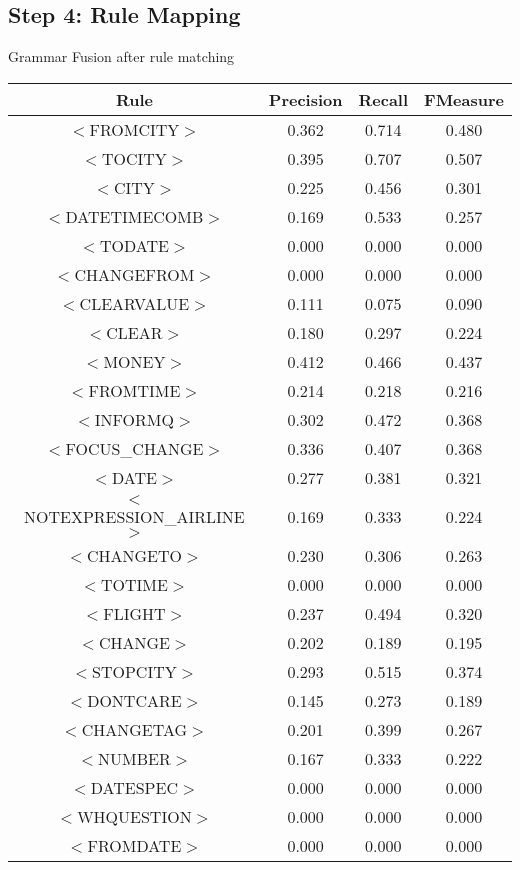 \documentclass[a4paper,10pt]{article}
\begin{document}
\subsection{Step 4: Rule Mapping}
Grammar Fusion after rule matching

 \label{tab:title} 
\begin{center}
\begin{tabular}{|c||c|c|c|}
\hline
Rule&Precision&Recall&FMeasure\\
\hline
\hline
$<$FROMCITY$>$&0.362&0.714&0.480 \\
\hline$<$TOCITY$>$&0.395&0.707&0.507 \\
\hline$<$CITY$>$&0.225&0.456&0.301 \\
\hline$<$DATETIMECOMB$>$&0.169&0.533&0.257 \\
\hline$<$TODATE$>$&0.000&0.000&0.000 \\
\hline$<$CHANGEFROM$>$&0.000&0.000&0.000 \\
\hline$<$CLEARVALUE$>$&0.111&0.075&0.090 \\
\hline$<$CLEAR$>$&0.180&0.297&0.224 \\
\hline$<$MONEY$>$&0.412&0.466&0.437 \\
\hline$<$FROMTIME$>$&0.214&0.218&0.216 \\
\hline$<$INFORMQ$>$&0.302&0.472&0.368 \\
\hline$<$FOCUS\_CHANGE$>$&0.336&0.407&0.368 \\
\hline$<$DATE$>$&0.277&0.381&0.321 \\
\hline$<$NOTEXPRESSION\_AIRLINE$>$&0.169&0.333&0.224 \\
\hline$<$CHANGETO$>$&0.230&0.306&0.263 \\
\hline$<$TOTIME$>$&0.000&0.000&0.000 \\
\hline$<$FLIGHT$>$&0.237&0.494&0.320 \\
\hline$<$CHANGE$>$&0.202&0.189&0.195 \\
\hline$<$STOPCITY$>$&0.293&0.515&0.374 \\
\hline$<$DONTCARE$>$&0.145&0.273&0.189 \\
\hline$<$CHANGETAG$>$&0.201&0.399&0.267 \\
\hline$<$NUMBER$>$&0.167&0.333&0.222 \\
\hline$<$DATESPEC$>$&0.000&0.000&0.000 \\
\hline$<$WHQUESTION$>$&0.000&0.000&0.000 \\
\hline$<$FROMDATE$>$&0.000&0.000&0.000 \\

\end{tabular}
\end{center}
\end{document}
